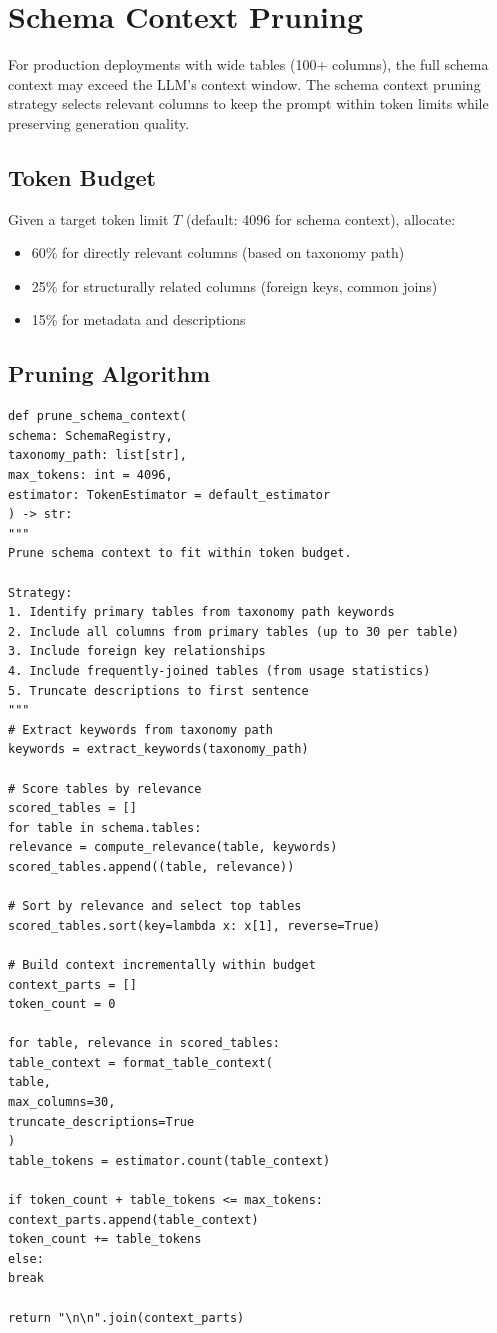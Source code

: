 \documentclass[12pt,a4paper,twoside]{report}
\begin{document}
\section{Schema Context Pruning}
\label{sec:schema-context-pruning}

For production deployments with wide tables (100+ columns), the full schema context
may exceed the LLM's context window. The schema context pruning strategy selects
relevant columns to keep the prompt within token limits while preserving generation quality.

\subsection{Token Budget}

Given a target token limit $T$ (default: 4096 for schema context), allocate:
\begin{itemize}
\item 60\% for directly relevant columns (based on taxonomy path)
\item 25\% for structurally related columns (foreign keys, common joins)
\item 15\% for metadata and descriptions
\end{itemize}

\subsection{Pruning Algorithm}

\begin{lstlisting}[language=jsonx,caption={Schema context pruning algorithm}]
def prune_schema_context(
schema: SchemaRegistry,
taxonomy_path: list[str],
max_tokens: int = 4096,
estimator: TokenEstimator = default_estimator
) -> str:
"""
Prune schema context to fit within token budget.

Strategy:
1. Identify primary tables from taxonomy path keywords
2. Include all columns from primary tables (up to 30 per table)
3. Include foreign key relationships
4. Include frequently-joined tables (from usage statistics)
5. Truncate descriptions to first sentence
"""
# Extract keywords from taxonomy path
keywords = extract_keywords(taxonomy_path)

# Score tables by relevance
scored_tables = []
for table in schema.tables:
relevance = compute_relevance(table, keywords)
scored_tables.append((table, relevance))

# Sort by relevance and select top tables
scored_tables.sort(key=lambda x: x[1], reverse=True)

# Build context incrementally within budget
context_parts = []
token_count = 0

for table, relevance in scored_tables:
table_context = format_table_context(
table,
max_columns=30,
truncate_descriptions=True
)
table_tokens = estimator.count(table_context)

if token_count + table_tokens <= max_tokens:
context_parts.append(table_context)
token_count += table_tokens
else:
break

return "\n\n".join(context_parts)
\end{lstlisting}
\end{document}
